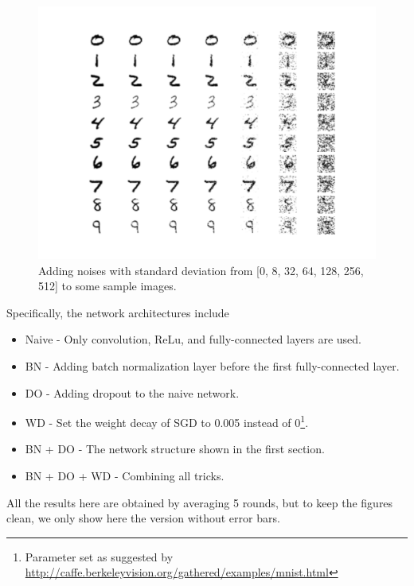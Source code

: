 \documentclass[11pt]{article}
\begin{document}
\begin{figure}[ht]
    \includegraphics[width=.9\textwidth]{Figs/exp2_imgs}
    \caption{Adding noises with standard deviation from [0, 8, 32, 64, 128, 256, 512] to some sample images.}\label{fig:exp2imgs}
\end{figure}


Specifically, the network architectures include

\begin{itemize}
    \item Naive - Only convolution, ReLu, and fully-connected layers are used.
    \item BN - Adding batch normalization layer before the first fully-connected layer.
    \item DO - Adding dropout to the naive network.
    \item WD - Set the weight decay of SGD to 0.005 instead of 0\footnote{Parameter set as suggested by \url{http://caffe.berkeleyvision.org/gathered/examples/mnist.html}}.
    \item BN + DO - The network structure shown in the first section.
    \item BN + DO + WD - Combining all tricks.
\end{itemize}

All the results here are obtained by averaging 5 rounds, but to keep the figures clean, we only show here the version without error bars.
\end{document}
